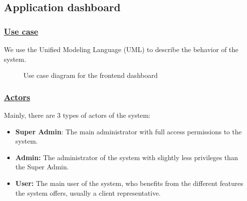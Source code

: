 \subsection{Application dashboard}

\subsubsection*{\underline{Use case}}
We use the Unified Modeling Language (UML) to describe the behavior of the system.
\begin{figure}[H]
	\centering
	\caption{Use case diagram for the frontend dashboard}
	\label{fig:use-case-diagram}
\end{figure}

\subsubsection*{\underline{Actors}}
Mainly, there are 3 types of actors of the system:
\begin{itemize}
	\item \textbf{Super Admin}: The main administrator with full access permissions to the system.
	\item \textbf{Admin:} The administrator of the system with slightly less privileges than the Super Admin.
	\item \textbf{User:} The main user of the system, who benefits from the different features the system offers, usually a client representative.
\end{itemize}


